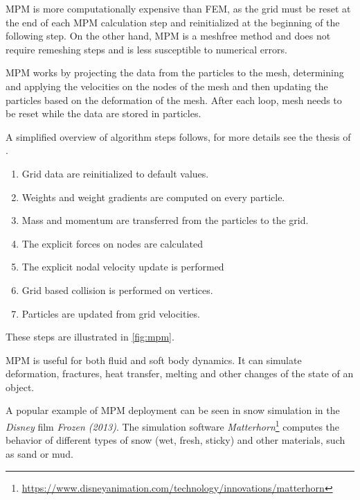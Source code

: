 MPM is more computationally expensive than FEM, as the grid must be reset at the end of each MPM calculation step and reinitialized at the beginning of the following step. On the other hand, MPM is a meshfree method and does not require remeshing steps and is less susceptible to numerical errors. 

MPM works by projecting the data from the particles to the mesh, determining and applying the velocities on the nodes of the mesh and then updating the particles based on the deformation of the mesh. After each loop, mesh needs to be reset while the data are stored in particles.

 A simplified overview of algorithm steps follows, for more details see the thesis of \citet{jiang2015material}.
 
\begin{enumerate}
    \item Grid data are reinitialized to default values.
    \item Weights and weight gradients are computed on every particle.
    \item Mass and momentum are transferred from the particles to the grid.
    \item The explicit forces on nodes are calculated
    \item The explicit nodal velocity update is performed
    \item Grid based collision is performed on vertices.
    \item Particles are updated from grid velocities.
\end{enumerate}
These steps are illustrated in \cref{fig:mpm}.

MPM is useful for both fluid and soft body dynamics. It can simulate deformation, fractures, heat transfer, melting and other changes of the state of an object.

A popular example of MPM deployment can be seen in snow simulation in the \emph{Disney} film \emph{Frozen (2013)}. The simulation software \emph{Matterhorn}\footnote{\url{https://www.disneyanimation.com/technology/innovations/matterhorn}} computes the behavior of different types of snow (\eg wet, fresh, sticky) and other materials, such as sand or mud.

